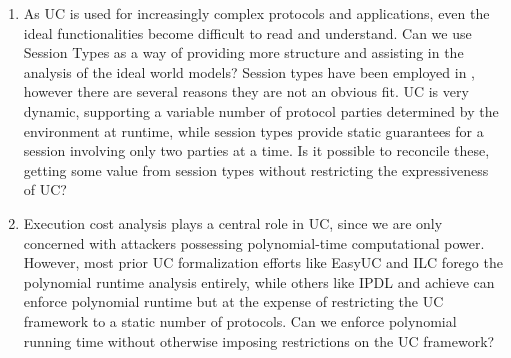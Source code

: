 \begin{enumerate}
\item 
As UC is used for increasingly complex protocols and applications, even the ideal functionalities become difficult to read and understand. Can we use Session Types as a way of providing more structure and assisting in the analysis of the ideal world models?
Session types have been employed in , however there are several reasons they are not an obvious fit.
UC is very dynamic, supporting a variable number of protocol parties determined by the environment at runtime, while session types provide static guarantees for a session involving only two parties at a time.
Is it possible to reconcile these, getting some value from session types without restricting the expressiveness of UC?

\item Execution cost analysis plays a central role in UC, since we are only concerned with
attackers possessing polynomial-time computational power.
However, most prior UC formalization efforts like EasyUC and ILC forego the polynomial runtime analysis entirely, while others like IPDL and  achieve can enforce polynomial runtime but at the expense of restricting the UC framework to a static number of protocols.
Can we enforce polynomial running time without otherwise imposing restrictions on the UC framework?

\end{enumerate}

